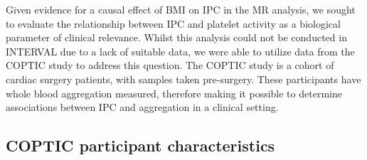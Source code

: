 \documentclass[11pt,twoside]{bristolthesis}
\begin{document}
Given evidence for a causal effect of BMI on IPC in the MR analysis, we sought to evaluate the relationship between IPC and platelet activity as a biological parameter of clinical relevance. Whilst this analysis could not be conducted in INTERVAL due to a lack of suitable data, we were able to utilize data from the COPTIC study to address this question. The COPTIC study is a cohort of cardiac surgery patients, with samples taken pre-surgery. These participants have whole blood aggregation measured, therefore making it possible to determine associations between IPC and aggregation in a clinical setting.

\hypertarget{coptic-participant-characteristics}{%
\subsection{COPTIC participant characteristics}\label{coptic-participant-characteristics}}
\end{document}
